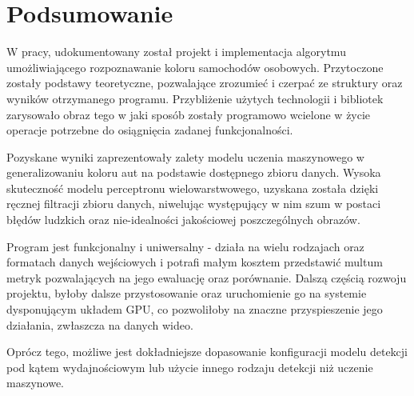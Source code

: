 \section*{Podsumowanie} 

W pracy, udokumentowany został projekt i implementacja algorytmu umożliwiającego rozpoznawanie koloru samochodów osobowych. Przytoczone zostały podstawy teoretyczne, pozwalające zrozumieć i czerpać ze struktury oraz wyników otrzymanego programu. Przybliżenie użytych technologii i bibliotek zarysowało obraz tego w jaki sposób zostały programowo wcielone w życie operacje potrzebne do osiągnięcia zadanej funkcjonalności. 

Pozyskane wyniki zaprezentowały zalety modelu uczenia maszynowego w generalizowaniu koloru aut na podstawie dostępnego zbioru danych. Wysoka skuteczność modelu perceptronu wielowarstwowego, uzyskana została dzięki ręcznej filtracji zbioru danych, niwelując występujący w nim szum w postaci błędów ludzkich oraz nie-idealności jakościowej poszczególnych obrazów.

Program jest funkcjonalny i uniwersalny - działa na wielu rodzajach oraz formatach danych wejściowych i potrafi małym kosztem przedstawić multum metryk pozwalających na jego ewaluację oraz porównanie. Dalszą częścią rozwoju projektu, byłoby dalsze przystosowanie oraz uruchomienie go na systemie dysponującym układem GPU, co pozwoliłoby na znaczne przyspieszenie jego działania, zwłaszcza na danych wideo.

Oprócz tego, możliwe jest dokładniejsze dopasowanie konfiguracji modelu detekcji pod kątem wydajnościowym lub użycie innego rodzaju detekcji niż uczenie maszynowe.